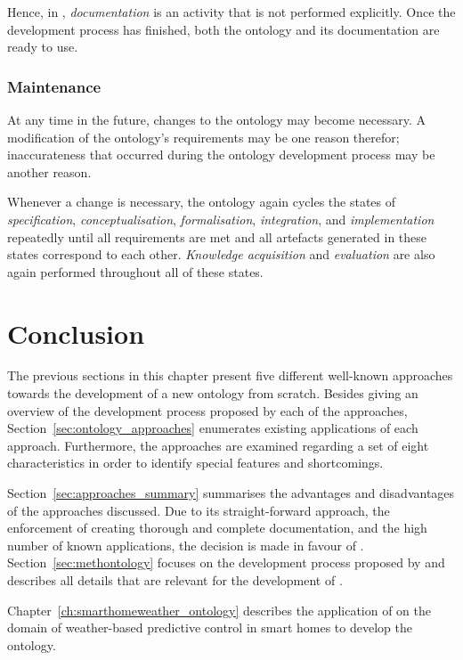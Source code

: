 Hence, in \methontology, \emph{documentation} is an activity that is not performed explicitly. Once the development process has finished, both the ontology and its documentation are ready to use. 

\subsubsection{Maintenance}

At any time in the future, changes to the ontology may become necessary. A modification of the ontology's requirements may be one reason therefor; inaccurateness that occurred during the ontology development process may be another reason.

Whenever a change is necessary, the ontology again cycles the states of \emph{specification}, \emph{conceptualisation}, \emph{formalisation}, \emph{integration}, and \emph{implementation} repeatedly until all requirements are met and all artefacts generated in these states correspond to each other. \emph{Knowledge acquisition} and \emph{evaluation} are also again performed throughout all of these states.

\section{Conclusion}

The previous sections in this chapter present five different well-known approaches towards the development of a new ontology from scratch. Besides giving an overview of the development process proposed by each of the approaches, Section~\ref{sec:ontology_approaches} enumerates existing applications of each approach. Furthermore, the approaches are examined regarding a set of eight characteristics in order to identify special features and shortcomings.

Section~\ref{sec:approaches_summary} summarises the advantages and disadvantages of the approaches discussed. Due to its straight-forward approach, the enforcement of creating thorough and complete documentation, and the high number of known applications, the decision is made in favour of \methontology. Section~\ref{sec:methontology} focuses on the development process proposed by \methontology and describes all details that are relevant for the development of \smarthomeweather.

Chapter~\ref{ch:smarthomeweather_ontology} describes the application of \methontology on the domain of weather-based predictive control in smart homes to develop the \smarthomeweather ontology.
